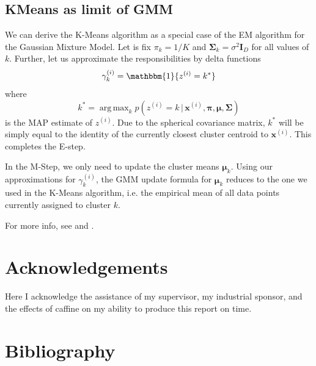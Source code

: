 \documentclass[final,3p,times,twocolumn]{elsarticle}
\DeclareMathOperator*{\argmax}{arg\,max}
\begin{document}
\subsection{KMeans as limit of GMM}
We can derive the K-Means algorithm as a special case of the EM algorithm for the Gaussian Mixture Model.
Let is fix $\pi_k = 1/K$ and $\boldsymbol \Sigma_k = \sigma^2 \boldsymbol I_D$ for all values of $k$.
Further, let us approximate the responsibilities by delta functions
\begin{equation}
\label{eqn:gmmdelta}
\gamma_k^{(i)} = \mathbbm{1}\{z^{(i)} = k^*\}
\end{equation}
where
\begin{equation}
k^* = \argmax_k p(z^{(i)} = k\,|\,\boldsymbol x^{(i)},\boldsymbol \pi, \boldsymbol \mu, \boldsymbol \Sigma)
\end{equation}
is the MAP estimate of $z^{(i)}$.
Due to the spherical covariance matrix, $k^*$ will be simply equal to the identity of the currently closest cluster centroid to $\boldsymbol x^{(i)}$. This completes the E-step.

In the M-Step, we only need to update the cluster means $\boldsymbol \mu_k$.
Using our approximations for $\gamma_k^{(i)}$, the GMM update formula for $\boldsymbol \mu_k$ reduces to the one we used in the K-Means algorithm, i.e. the empirical mean of all data points currently assigned to cluster $k$.

For more info, see \cite{Bishop} and \cite{Murphy}.


\section*{Acknowledgements}
Here I acknowledge the assistance of my supervisor, my industrial sponsor,
and the effects of caffine on my ability to produce this report on time.

\appendix



\section*{Bibliography}








\end{document}
